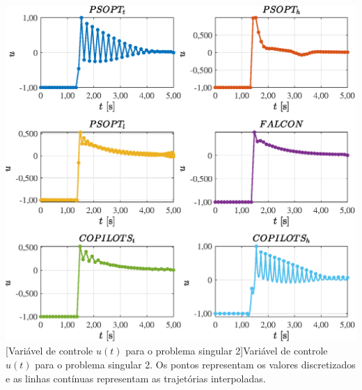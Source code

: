 \noindent
\begin{minipage}{\textwidth}
	\vspace{\onelineskip}
	\centering
	\includegraphics[scale=0.70]{fig/resultados/singular2/traj/u/u}
	[Variável de controle $u(t)$ para o problema singular 2]{Variável de controle $u(t)$ para o problema singular 2. Os pontos representam os valores discretizados e as linhas contínuas representam as trajetórias interpoladas.}
	\label{fig:singular2:u:u}
	\vspace{\onelineskip}
\end{minipage}




